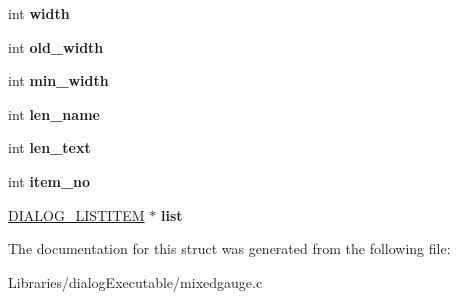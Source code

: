 \begin{DoxyCompactItemize}
\item 
int {\bfseries width}\hypertarget{struct_d_i_a_l_o_g___m_i_x_e_d_g_a_u_g_e_abd54095401824265f61d6d1cd09529e7}{}\label{struct_d_i_a_l_o_g___m_i_x_e_d_g_a_u_g_e_abd54095401824265f61d6d1cd09529e7}

\item 
int {\bfseries old\+\_\+width}\hypertarget{struct_d_i_a_l_o_g___m_i_x_e_d_g_a_u_g_e_af20c0db32f877f60e761327469fa0230}{}\label{struct_d_i_a_l_o_g___m_i_x_e_d_g_a_u_g_e_af20c0db32f877f60e761327469fa0230}

\item 
int {\bfseries min\+\_\+width}\hypertarget{struct_d_i_a_l_o_g___m_i_x_e_d_g_a_u_g_e_ae8dbf4854f6a6ec5c4a6eef4b2d377a2}{}\label{struct_d_i_a_l_o_g___m_i_x_e_d_g_a_u_g_e_ae8dbf4854f6a6ec5c4a6eef4b2d377a2}

\item 
int {\bfseries len\+\_\+name}\hypertarget{struct_d_i_a_l_o_g___m_i_x_e_d_g_a_u_g_e_aa6d7085d8a40102afbe7959b929c40cb}{}\label{struct_d_i_a_l_o_g___m_i_x_e_d_g_a_u_g_e_aa6d7085d8a40102afbe7959b929c40cb}

\item 
int {\bfseries len\+\_\+text}\hypertarget{struct_d_i_a_l_o_g___m_i_x_e_d_g_a_u_g_e_a6b8e3d6b8c900e52120b4e9fa8e98fa7}{}\label{struct_d_i_a_l_o_g___m_i_x_e_d_g_a_u_g_e_a6b8e3d6b8c900e52120b4e9fa8e98fa7}

\item 
int {\bfseries item\+\_\+no}\hypertarget{struct_d_i_a_l_o_g___m_i_x_e_d_g_a_u_g_e_a38b57ad7482d00af42871a81dcffcce8}{}\label{struct_d_i_a_l_o_g___m_i_x_e_d_g_a_u_g_e_a38b57ad7482d00af42871a81dcffcce8}

\item 
\hyperlink{struct_d_i_a_l_o_g___l_i_s_t_i_t_e_m}{D\+I\+A\+L\+O\+G\+\_\+\+L\+I\+S\+T\+I\+T\+EM} $\ast$ {\bfseries list}\hypertarget{struct_d_i_a_l_o_g___m_i_x_e_d_g_a_u_g_e_a7cd5c97a2ce777a66cb5dd2c384adfc4}{}\label{struct_d_i_a_l_o_g___m_i_x_e_d_g_a_u_g_e_a7cd5c97a2ce777a66cb5dd2c384adfc4}

\end{DoxyCompactItemize}


The documentation for this struct was generated from the following file\+:\begin{DoxyCompactItemize}
\item 
Libraries/dialog\+Executable/mixedgauge.\+c\end{DoxyCompactItemize}
